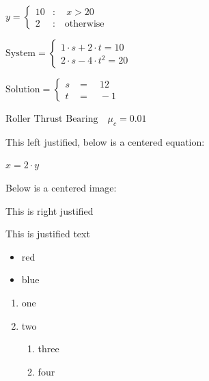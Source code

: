 \documentclass[
  letterpaper,
]{article}
\providecommand{\tightlist}{%
  \setlength{\itemsep}{0pt}\setlength{\parskip}{0pt}}
\begin{document}
\(y = \begin{cases} 10 &: \quad x>20 \\ 2 &: \quad \text{otherwise} \end{cases}\)

\(\text{System} = \begin{cases} 1\cdot s+2\cdot t=10 &  \\ 2\cdot s-4\cdot t^2=20 &  \end{cases}\)

\(\text{Solution} = \begin{cases} s & = \quad 12 \\ t & = \quad -1 \end{cases}\)

\(\text{Roller Thrust Bearing} \quad \mu_{c} = 0.01\)

This left justified, below is a centered equation:

\begin{center}

\(x=2\cdot y\)

\end{center}

Below is a centered image:

\begin{center}

\end{center}

\begin{flushright}

This is right justified

\end{flushright}

This is justified text

\begin{itemize}
\tightlist
\item
  red
\item
  blue
\end{itemize}

\begin{enumerate}
\def\labelenumi{\arabic{enumi}.}
\tightlist
\item
  one
\item
  two

  \begin{enumerate}
  \def\labelenumii{\alph{enumii}.}
  \tightlist
  \item
    three
  \item
    four
  \end{enumerate}
\end{enumerate}
\end{document}
